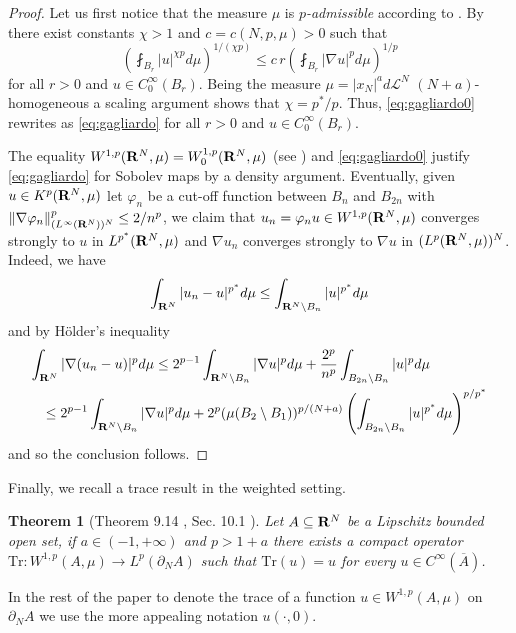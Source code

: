 \documentclass[10pt,reqno]{amsart}
\numberwithin{equation}{section}
\def\L{{\mathcal L}}
\def\R{{\bf R}}
\def\Wsp{W^{1,p}}
\def\Kpmu{K^p(\R^N,\mu)}
\def\Wspo{W_0^{1,p}}
\def\xn{x_N}
\newtheorem{theorem}{Theorem}[section]
\begin{document}
\begin{proof}
 Let us first notice that the measure $\mu$ is \emph{$p$-admissible} 
according to \cite[Chapters 1,5]{HKM}. By \cite[Theorem 15.21]{HKM} 
there exist constants $\chi>1$ and $c=c(N,p,\mu)>0$ such that
\begin{equation}
  \label{eq:gagliardo0}
\left(\fint_{B_r}|u|^{\chi p}d\mu\right)^{1/(\chi p)}\leq c\, r
\left(\fint_{B_r}|\nabla u|^pd\mu\right)^{1/p}
\end{equation}
for all $r>0$ and $u\in C^\infty_0(B_r)$. 
Being the measure $\mu=|\xn|^ad\L^N$ $(N+a)$-homogeneous 
a scaling argument shows that $\chi=p^\ast/p$.
Thus, \eqref{eq:gagliardo0} rewrites as \eqref{eq:gagliardo}
for all $r>0$ and $u\in C^\infty_0(B_r)$.

The equality $\Wsp(\R^N,\mu)=\Wspo(\R^N,\mu)$ 
(see \cite[Theorem 1.27]{HKM}) and \eqref{eq:gagliardo0} 
justify \eqref{eq:gagliardo} for Sobolev maps by a 
density argument.
Eventually, given $u\in\Kpmu$ let $\varphi_n$ be a cut-off 
function between $B_{n}$ and $B_{2n}$ with 
$\|\nabla\varphi_n\|^p_{(L^\infty(\R^N))^N}\leq 2/n^p$, we claim that  
$u_n=\varphi_nu\in\Wsp(\R^N,\mu)$ converges strongly to $u$ in 
$L^{p^\ast}(\R^N,\mu)$ and $\nabla u_n$ converges strongly to 
$\nabla u$ in $(L^p(\R^N,\mu))^N$. 
Indeed, we have
$$
\int_{\R^N}|u_n-u|^{p^\ast}d\mu\leq\int_{\R^N\setminus B_n}|u|^{p^\ast}d\mu
$$
and by H\"older's inequality
\begin{eqnarray*}
\lefteqn{\int_{\R^N}|\nabla(u_n-u)|^pd\mu\leq 
2^{p-1}\int_{\R^N\setminus B_n}|\nabla u|^pd\mu
+\frac{2^p}{n^p}\int_{B_{2n}\setminus B_n}|u|^pd\mu}\\
&&\leq 2^{p-1}\int_{\R^N\setminus B_n}|\nabla u|^pd\mu
+2^p(\mu(B_2\setminus B_1))^{p/(N+a)}
\left(\int_{B_{2n}\setminus B_n}|u|^{p^\ast}d\mu\right)^{p/p^\ast}
\end{eqnarray*}
and so the conclusion follows.
\end{proof}
Finally, we recall a trace result in the weighted setting.
\begin{theorem}[Theorem 9.14 \cite{Kuf}, Sec. 10.1 \cite{Nik}]\label{thmtracce}
Let $A\subseteq\R^N$ be a Lipschitz bounded open set, 
if $a\in(-1,+\infty)$ and $p>1+a$ there exists a compact operator
$\mathrm{Tr}:\Wsp(A,\mu)\to L^p(\partial_NA)$ such that $\mathrm{Tr}(u)=u$
for every $u\in C^\infty(\overline{A})$.
\end{theorem}
In the rest of the paper %
to denote the trace of a function $u\in \Wsp(A,\mu)$ on 
$\partial_NA$ we use the more appealing notation $u(\cdot,0)$.
\end{document}
